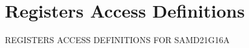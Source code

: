 \hypertarget{group___s_a_m_d21_g16_a__reg}{}\section{Registers Access Definitions}
\label{group___s_a_m_d21_g16_a__reg}
R\+E\+G\+I\+S\+T\+E\+RS A\+C\+C\+E\+SS D\+E\+F\+I\+N\+I\+T\+I\+O\+NS F\+OR S\+A\+M\+D21\+G16A 